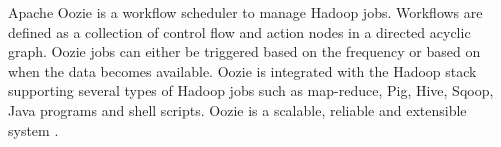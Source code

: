 Apache Oozie is a workflow scheduler to manage Hadoop jobs. Workflows are defined as a collection of control flow and action nodes in a directed acyclic graph. Oozie  jobs can either be triggered based on the frequency or based on when the data becomes available. Oozie is integrated with the Hadoop stack supporting several types of Hadoop jobs such as map-reduce, Pig, Hive, Sqoop, Java programs and shell scripts. Oozie is a scalable, reliable and extensible system \cite{oozie}.
